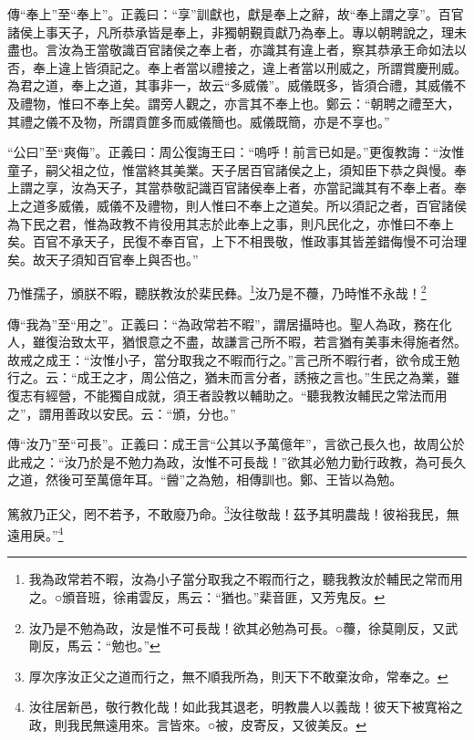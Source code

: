 {\noindent\zhuan{}\fzbyks 傳“奉上”至“奉上”。正義曰：“享”訓獻也，獻是奉上之辭，故“奉上謂之享”。百官諸侯上事天子，凡所恭承皆是奉上，非獨朝覲貢獻乃為奉上。專以朝聘說之，理未盡也。言汝為王當敬識百官諸侯之奉上者，亦識其有違上者，察其恭承王命如法以否，奉上違上皆須記之。奉上者當以禮接之，違上者當以刑威之，所謂賞慶刑威。為君之道，奉上之道，其事非一，故云“多威儀”。威儀既多，皆須合禮，其威儀不及禮物，惟曰不奉上矣。謂旁人觀之，亦言其不奉上也。鄭云：“朝聘之禮至大，其禮之儀不及物，所謂貢篚多而威儀簡也。威儀既簡，亦是不享也。” \par}

{\noindent\shu{}\fzkt “公曰”至“爽侮”。正義曰：周公復誨王曰：“嗚呼！前言已如是。”更復教誨：“汝惟童子，嗣父祖之位，惟當終其美業。天子居百官諸侯之上，須知臣下恭之與慢。奉上謂之享，汝為天子，其當恭敬記識百官諸侯奉上者，亦當記識其有不奉上者。奉上之道多威儀，威儀不及禮物，則人惟曰不奉上之道矣。所以須記之者，百官諸侯為下民之君，惟為政教不肯役用其志於此奉上之事，則凡民化之，亦惟曰不奉上矣。百官不承天子，民復不奉百官，上下不相畏敬，惟政事其皆差錯侮慢不可治理矣。故天子須知百官奉上與否也。” \par}

乃惟孺子，頒朕不暇，聽朕教汝於棐民彝。\footnote{我為政常若不暇，汝為小子當分取我之不暇而行之，聽我教汝於輔民之常而用之。○頒音班，徐甫雲反，馬云：“猶也。”棐音匪，又芳鬼反。}汝乃是不蘉，乃時惟不永哉！\footnote{汝乃是不勉為政，汝是惟不可長哉！欲其必勉為可長。○蘉，徐莫剛反，又武剛反，馬云：“勉也。”}

{\noindent\zhuan{}\fzbyks 傳“我為”至“用之”。正義曰：“為政常若不暇”，謂居攝時也。聖人為政，務在化人，雖復治致太平，猶恨意之不盡，故謙言己所不暇，若言猶有美事未得施者然。故戒之成王：“汝惟小子，當分取我之不暇而行之。”言己所不暇行者，欲令成王勉行之。云：“成王之才，周公倍之，猶未而言分者，誘掖之言也。”生民之為業，雖復志有經營，不能獨自成就，須王者設教以輔助之。“聽我教汝輔民之常法而用之”，謂用善政以安民。云：“頒，分也。” \par}

{\noindent\zhuan{}\fzbyks 傳“汝乃”至“可長”。正義曰：成王言“公其以予萬億年”，言欲己長久也，故周公於此戒之：“汝乃於是不勉力為政，汝惟不可長哉！”欲其必勉力勤行政教，為可長久之道，然後可至萬億年耳。“醟”之為勉，相傳訓也。鄭、王皆以為勉。 \par}

篤敘乃正父，罔不若予，不敢廢乃命。\footnote{厚次序汝正父之道而行之，無不順我所為，則天下不敢棄汝命，常奉之。}汝往敬哉！茲予其明農哉！彼裕我民，無遠用戾。”\footnote{汝往居新邑，敬行教化哉！如此我其退老，明教農人以義哉！彼天下被寬裕之政，則我民無遠用來。言皆來。○被，皮寄反，又彼美反。}

